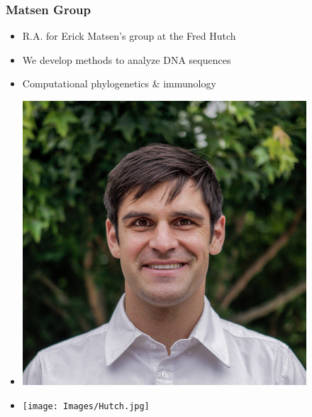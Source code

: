 \documentclass[mathserif,compress]{beamer}
\renewcommand\;{\,}
\begin{document}
\begin{frame}
\begin{center}
\begin{minipage}{0.49\linewidth}
\begin{itemize}
\begin{center}
\end{center}
\end{itemize}
\end{minipage}
\end{center}
\end{frame}

\begin{frame}\frametitle{Matsen Group}
\begin{minipage}{0.49\linewidth}
\begin{itemize}
\bigskip
\item R.A. for Erick Matsen's group at the Fred Hutch
\bigskip
\item We develop methods to analyze DNA sequences
\bigskip
\item Computational phylogenetics \& immunology
\end{itemize}
\end{minipage}
\begin{minipage}{0.49\linewidth}
\begin{itemize}
\item[]
\begin{center}
\includegraphics[width=0.7\linewidth]{Images/Erick.png}
\end{center}
\item[]
\begin{center}
\texttt{[image: Images/Hutch.jpg]}
\end{center}
\end{itemize}
\end{minipage}
\end{frame}
\end{document}

